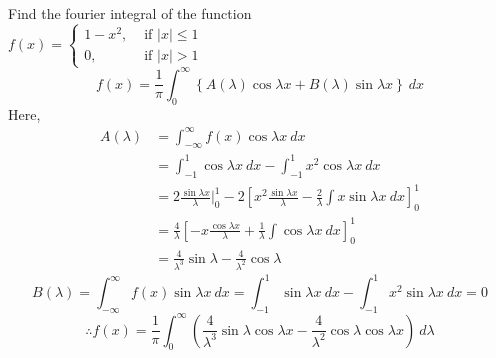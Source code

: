 \documentclass[12pt]{article}
\numberwithin{equation}{subsection}
\begin{document}
\begin{example}{
        Find the fourier integral of the function\\
        $\displaystyle f(x) = 
        \begin{cases}
            1-x^2, &\text{ if }|x| \le 1 \\
            0, & \text{ if } |x| > 1
        \end{cases}$
    }{}
    \begin{equation*}
        f(x) = \frac{1}{\pi} \int_{0}^{\infty} { \left\{ A(\lambda) \cos{\lambda x} + B(\lambda) \sin{\lambda x} \right\} } \: d{x}
    \end{equation*}
    Here,
    \begin{align*}
        A(\lambda) &= \int_{-\infty}^{\infty} { f(x) \cos{\lambda x} } \: d{x} \\
        &= \int_{-1}^{1} {\cos{\lambda x}} \: d{x} - \int_{-1}^{1} {x^2 \cos{\lambda x}} \: d{x} \\
        &= 2 \frac{\sin{\lambda x}}{\lambda}\bigg|_{0}^{1} - 2 \left[ x^2 \frac{\sin{\lambda x}}{\lambda} - \frac{2}{\lambda} \int{ x \sin{\lambda x} } \: d{x} \right]_{0}^{1} \\
        &= \frac{4}{\lambda} \left[ -x \frac{\cos{\lambda x}}{\lambda} + \frac{1}{\lambda} \int{\cos{\lambda x}} \: d{x} \right]_{0}^{1} \\
        &= \frac{4}{\lambda^3} \sin{\lambda} - \frac{4}{\lambda^2} \cos{\lambda}
    \end{align*}
    \[
        B(\lambda) = \int_{-\infty}^{\infty} { f(x) \sin{\lambda x} } \: d{x} = \int_{-1}^{1} {\sin{\lambda x}} \: d{x} - \int_{-1}^{1} {x^2 \sin{\lambda x}} \: d{x} = 0
    \]
    \[
        \therefore f(x) = \frac{1}{\pi} \int_{0}^{\infty} { \left( \frac{4}{\lambda^3} \sin{\lambda} \cos{\lambda x} - \frac{4}{\lambda^2} \cos{\lambda} \cos{\lambda x} \right) } \: d{\lambda}
    \]
\end{example}
\end{document}
